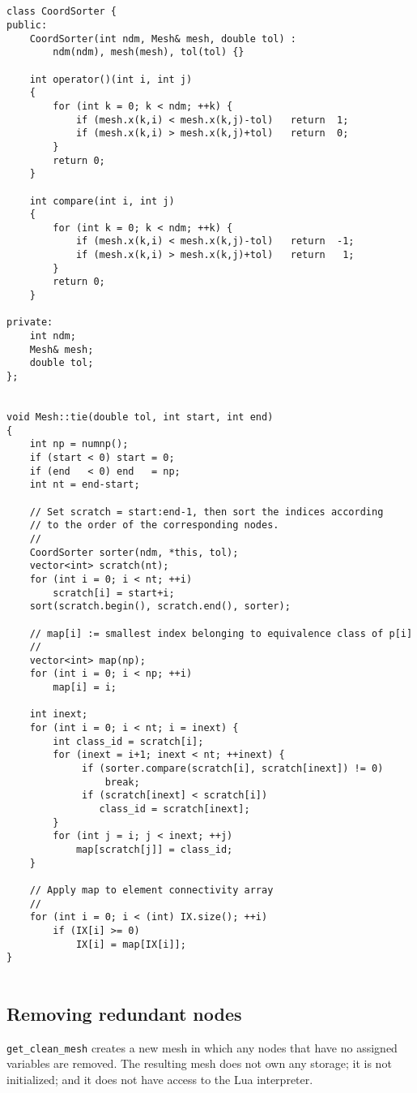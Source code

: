 \begin{verbatim}


class CoordSorter {
public:
    CoordSorter(int ndm, Mesh& mesh, double tol) :
        ndm(ndm), mesh(mesh), tol(tol) {}

    int operator()(int i, int j)
    {
        for (int k = 0; k < ndm; ++k) {
            if (mesh.x(k,i) < mesh.x(k,j)-tol)   return  1;
            if (mesh.x(k,i) > mesh.x(k,j)+tol)   return  0;
        }
        return 0;
    }

    int compare(int i, int j)
    {
        for (int k = 0; k < ndm; ++k) {
            if (mesh.x(k,i) < mesh.x(k,j)-tol)   return  -1;
            if (mesh.x(k,i) > mesh.x(k,j)+tol)   return   1;
        }
        return 0;
    }

private:
    int ndm;
    Mesh& mesh;
    double tol;
};


void Mesh::tie(double tol, int start, int end)
{
    int np = numnp();
    if (start < 0) start = 0;
    if (end   < 0) end   = np;
    int nt = end-start;

    // Set scratch = start:end-1, then sort the indices according
    // to the order of the corresponding nodes.
    //
    CoordSorter sorter(ndm, *this, tol);
    vector<int> scratch(nt);
    for (int i = 0; i < nt; ++i) 
        scratch[i] = start+i;
    sort(scratch.begin(), scratch.end(), sorter);

    // map[i] := smallest index belonging to equivalence class of p[i]
    //
    vector<int> map(np);
    for (int i = 0; i < np; ++i) 
        map[i] = i;

    int inext;
    for (int i = 0; i < nt; i = inext) {
        int class_id = scratch[i];
        for (inext = i+1; inext < nt; ++inext) {
             if (sorter.compare(scratch[i], scratch[inext]) != 0)
                 break;
             if (scratch[inext] < scratch[i])
                class_id = scratch[inext];
        }
        for (int j = i; j < inext; ++j)
            map[scratch[j]] = class_id;
    }

    // Apply map to element connectivity array
    //
    for (int i = 0; i < (int) IX.size(); ++i)
        if (IX[i] >= 0)
            IX[i] = map[IX[i]];
}


\end{verbatim}
\subsection{Removing redundant nodes}

{\tt get\_clean\_mesh} creates a new mesh in which any nodes that have
no assigned variables are removed.  The resulting mesh does not own any
storage; it is not initialized; and it does not have access to the
Lua interpreter.

